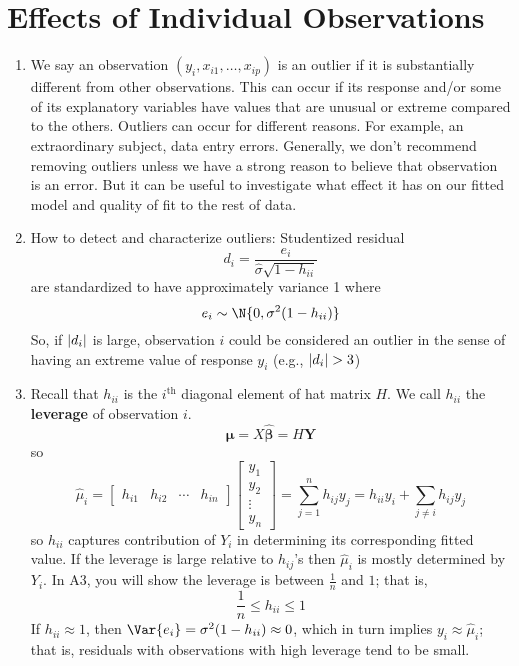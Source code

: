 \section{Effects of Individual Observations}
\begin{enumerate}[(1)]
    \item We say an observation $ (y_i,x_{i1},\ldots,x_{ip}) $
          is an outlier if it is substantially different from other
          observations. This can occur if its response
          and/or some of its explanatory variables have values that are unusual
          or extreme compared to the others. Outliers can occur
          for different reasons. For example, an extraordinary
          subject, data entry errors. Generally, we don't recommend removing
          outliers unless we have a strong reason to believe that observation
          is an error. But it can be useful to investigate what
          effect it has on our fitted model and quality of fit to
          the rest of data.
    \item How to detect and characterize outliers: Studentized residual
          \[ d_i=\frac{e_i}{\hat{\sigma}\sqrt{1-h_{ii}}}  \]
          are standardized to have approximately variance 1 where
          \[ e_i\sim\N{0,\sigma^2(1-h_{ii})} \]
          So, if $ \lvert d_i\rvert $ is large, observation $ i $ could
          be considered an outlier in the sense of having an
          extreme value of response $ y_i $ (e.g., $ \lvert d_i\rvert>3 $)
    \item Recall that $ h_{ii} $ is the $ i^{\text{th}} $ diagonal
          element of hat matrix $ H $. We call $ h_{ii} $ the \textbf{leverage}
          of observation $ i $.
          \[ \hat{\symbf{\mu}}=X\hat{\symbf{\beta}}=H\symbf{Y} \]
          so
          \[ \hat{\mu}_i=\begin{bmatrix}
                  h_{i1} & h_{i2} & \cdots & h_{i n}
              \end{bmatrix}\begin{bmatrix}
                  y_1    \\
                  y_2    \\
                  \vdots \\
                  y_n
              \end{bmatrix}=\sum_{j=1}^{n} h_{i j}y_j
              =h_{ii}y_i+\sum_{j\neq i}h_{i j}y_j  \]
          so $ h_{ii} $ captures contribution of $ Y_i $ in determining
          its corresponding fitted value. If the leverage is large
          relative to $ h_{ij} $'s then $ \hat{\mu}_i $
          is mostly determined by $ Y_i $. In A3, you will show
          the leverage is between $ \frac{1}{n} $ and $ 1 $; that is,
          \[ \frac{1}{n} \le h_{ii}\le 1 \]
          If $ h_{ii}\approx 1 $, then $ \Var{e_i}=\sigma^2(1-h_{ii})\approx 0 $,
          which in turn implies $ y_i\approx \hat{\mu}_i $; that is,
          residuals with observations with high leverage tend to be small.


\end{enumerate}
